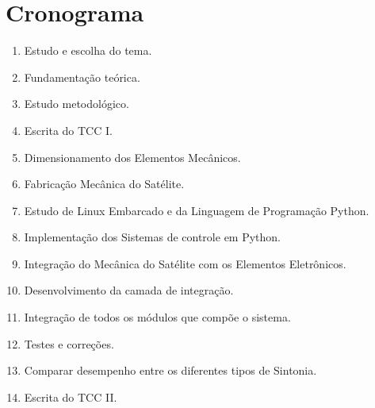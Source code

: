 \chapter{Cronograma}

\begin{enumerate}
	\item \label{escolhatema} Estudo e escolha do tema.
	\item \label{refteorico} Fundamentação teórica.
	\item \label{metodologia} Estudo metodológico.
	\item \label{esctcci} Escrita do TCC I.
	\item \label{dimemecanica} Dimensionamento dos Elementos Mecânicos.
	\item \label{mecanica} Fabricação Mecânica do Satélite.
	\item \label{estudol} Estudo de Linux Embarcado e da Linguagem de Programação Python.
	\item \label{implementacao} Implementação dos Sistemas de controle em Python. 
	\item \label{integracaomec} Integração do Mecânica do Satélite com os Elementos Eletrônicos.
	\item \label{devapp} Desenvolvimento da camada de integração.
	\item \label{integracaosistema} Integração de todos os módulos que compõe o sistema.
	\item \label{testc} Testes e correções.
	\item \label{comapracoes} Comparar desempenho entre os diferentes tipos de Sintonia.
	\item \label{esctccii} Escrita do TCC II.
\end{enumerate}

